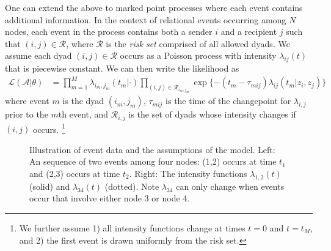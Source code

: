 \documentclass{article}
\begin{document}
One can extend the above to marked point processes where each event contains additional information.  In the context of relational events occurring among $N$ nodes, each event in the process contains both a sender $i$ and a recipient $j$ such that  $(i,j) \in \mathcal{R}$, where $\mathcal{R}$ is the \emph{risk set} comprised of all allowed dyads.  We assume each dyad $(i,j) \in \mathcal{R}$ occurs as a Poisson process with intensity $\lambda_{ij}(t)$ that is piecewise constant.  We can then write the likelihood as  
\begin{align}
\mathcal{L}(\mathcal{A}|\theta) &= \prod_{m=1}^M \lambda_{i_m,j_m}(t_m|\cdot) \prod_{(i,j) \in \mathcal{R}_{i_m,j_m}}\exp\{ - (t_m - \tau_{mij}) \lambda_{ij}(t_m | z_i,z_j) \}
\label{eqn:llk}
\end{align}
\noindent where event $m$ is the dyad $(i_m,j_m)$, $\tau_{mij}$ is the time  of the changepoint for $\lambda_{i,j}$ prior to the $m$th event, and $\mathcal{R}_{i,j}$ is the set of dyads whose intensity changes if $(i,j)$ occurs. \footnote{We further assume 1) all intensity functions change at times $t=0$ and $t=t_M$, and 2) the first event is drawn uniformly from the risk set.}

\begin{figure}

\centering 
{}
\caption[]{Illustration of event data and the assumptions of the model.  Left: An sequence of two events among four nodes: (1,2) occurs at time $t_1$ and (2,3) occurs at time $t_2$.  Right: The intensity functions $\lambda_{1,2}(t)$ (solid) and $\lambda_{34}(t)$ (dotted).  Note $\lambda_{34}$ can only change when events occur that involve either node 3 or node 4.\footnotemark }
\label{fig:example}
\end{figure}
\end{document}

